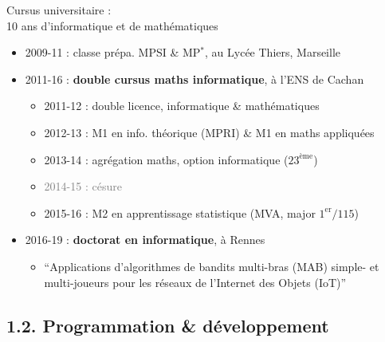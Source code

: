 \documentclass[11pt,english,ignorenonframetext,]{beamer}
\providecommand{\tightlist}{%
  \setlength{\itemsep}{0pt}\setlength{\parskip}{0pt}}
\begin{document}
\begin{frame}{Cursus universitaire :\\
  10 ans d'\textcolor{info}{informatique} et de \textcolor{maths}{mathématiques}}

\pause

\begin{itemize}
\tightlist
\item
  2009-11 : classe prépa. \textcolor{maths}{M}PSI \& \textcolor{maths}{M}P\(^*\), au Lycée Thiers, Marseille

\vspace*{10pt}
\pause
\item
  2011-16 : \textbf{double cursus \textcolor{maths}{maths} \textcolor{info}{informatique}}, à l'ENS de Cachan

  \begin{itemize}[<+->]
  \tightlist
  \item
    2011-12 : double licence, \textcolor{info}{informatique} \& \textcolor{maths}{mathématiques}
  \item
    2012-13 : M1 en \textcolor{info}{info. théorique} (MPRI) \& M1 en \textcolor{maths}{maths appliquées}
  \item
    2013-14 : \textcolor{maths}{agrégation maths}, \textcolor{info}{option informatique} ($23^{\text{ème}}$)
  \item
    \textcolor{gray}{2014-15 : césure}
  \item
    2015-16 : M2 en \textcolor{ml}{apprentissage statistique} (MVA, major $1^{\text{er}}/115$)
  \end{itemize}

\pause
\vspace*{10pt}
  \item
  2016-19 : \textbf{doctorat en \textcolor{info}{informatique}}, à Rennes

  \begin{itemize}
  \tightlist
  \item
    ``Applications d'algorithmes de \textcolor{ml}{bandits multi-bras (MAB)} simple-
    et multi-joueurs pour les réseaux de l'Internet des Objets (IoT)''
  \end{itemize}
\end{itemize}

\end{frame}


\subsection{\hfill{}1.2. Programmation \& développement\hfill{}}
\end{document}
